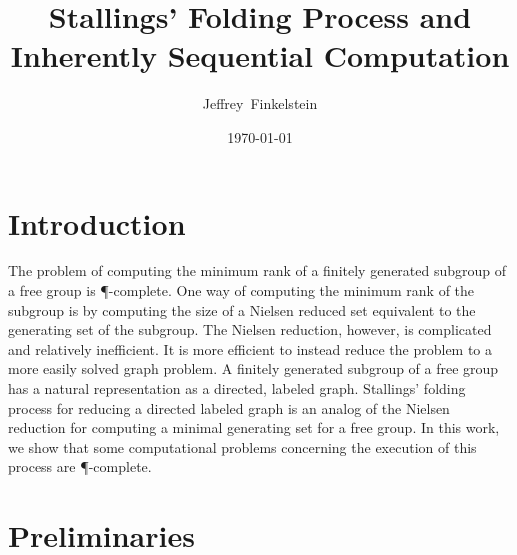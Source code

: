 \documentclass{article}
\author{Jef{}frey~Finkelstein}
\title{Stallings' Folding Process and Inherently Sequential Computation}
\date{\today}
\begin{document}
\maketitle

\abstract{}

\section{Introduction}

The problem of computing the minimum rank of a finitely generated subgroup of a free group is \P-complete.
One way of computing the minimum rank of the subgroup is by computing the size of a Nielsen reduced set equivalent to the generating set of the subgroup.
The Nielsen reduction, however, is complicated and relatively inefficient.
It is more efficient to instead reduce the problem to a more easily solved graph problem.
A finitely generated subgroup of a free group has a natural representation as a directed, labeled graph.
Stallings' folding process \cite[Algorithm~5.4]{stallings83} for reducing a directed labeled graph is an analog of the Nielsen reduction for computing a minimal generating set for a free group.
In this work, we show that some computational problems concerning the execution of this process are \P-complete.

\section{Preliminaries}
\end{document}
